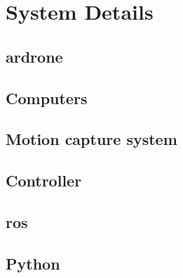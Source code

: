 \appendix
\chapter{System Details}
\section{\gls{ardrone}}
\section{Computers}  %
\section{Motion capture system}
\section{Controller}
\section{\gls{ros}}  %
\section{Python}
